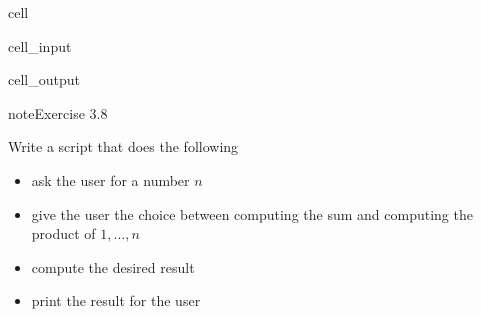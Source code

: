 \documentclass[letterpaper,10pt,english]{jupyterBook}
\begin{document}
\begin{sphinxuseclass}{cell}\begin{sphinxVerbatimInput}

\begin{sphinxuseclass}{cell_input}
\begin{sphinxVerbatim}[commandchars=\\\{\}]
  \PYG{p}{[}  \PYG{p}{]} 
  \PYG{p}{[}  \PYG{p}{]} 
  \PYG{p}{[}\PYG{p}{]}        

      
                 
    
\end{sphinxVerbatim}

\end{sphinxuseclass}\end{sphinxVerbatimInput}
\begin{sphinxVerbatimOutput}

\begin{sphinxuseclass}{cell_output}
\begin{sphinxVerbatim}[commandchars=\\\{\}]
[6, 24, 40]
\end{sphinxVerbatim}

\end{sphinxuseclass}\end{sphinxVerbatimOutput}

\end{sphinxuseclass}
\begin{sphinxadmonition}{note}{Exercise 3.8}

\sphinxAtStartPar
Write a script that does the following
\begin{itemize}
\item {} 
\sphinxAtStartPar
ask the user for a number \(n\)

\item {} 
\sphinxAtStartPar
give the user the choice between computing the sum and computing the product of \(1,\ldots,n\)

\item {} 
\sphinxAtStartPar
compute the desired result

\item {} 
\sphinxAtStartPar
print the result for the user

\end{itemize}
\end{sphinxadmonition}
\end{document}
